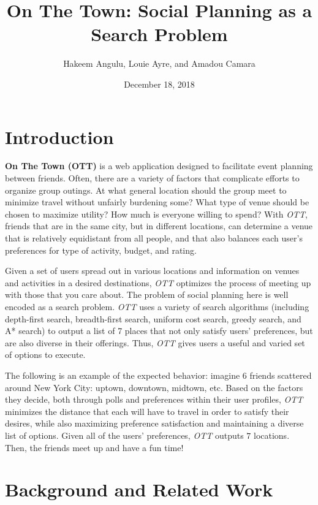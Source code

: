 \documentclass[11pt]{article}
\title{On The Town: Social Planning as a Search Problem}
\author{Hakeem Angulu, Louie Ayre, and Amadou Camara}
\date{December 18, 2018}
\begin{document}
\maketitle{}

\tableofcontents

\newpage

\section{Introduction}

\textbf{On The Town (OTT)} is a web application designed to facilitate event planning between friends. Often, there are a variety of factors that complicate efforts to organize group outings. At what general location should the group meet to minimize travel without unfairly burdening some? What type of venue should be chosen to maximize utility? How much is everyone willing to spend? With \emph{OTT}, friends that are in the same city, but in different locations, can determine a venue  that is relatively equidistant from all people, and that also balances each user's preferences for type of activity, budget, and rating. 

Given a set of users spread out in various locations and information on venues and activities in a desired destinations, \emph{OTT} optimizes the process of meeting up with those that you care about. The problem of social planning here is well encoded as a search problem. \emph{OTT} uses a variety of search algorithms (including depth-first search, breadth-first search, uniform cost search, greedy search, and A* search) to output a list of 7 places that not only satisfy users' preferences, but are also diverse in their offerings. Thus, \emph{OTT} gives users a useful and varied set of options to execute.

The following is an example of the expected behavior: imagine $6$ friends scattered around New York City: uptown, downtown, midtown, etc. Based on the factors they decide, both through polls and preferences within their user profiles, \emph{OTT} minimizes the distance that each will have to travel in order to satisfy their desires, while also maximizing preference satisfaction and maintaining a diverse list of options. Given all of the users’ preferences, \emph{OTT} outputs $7$ locations. Then, the friends meet up and have a fun time!

\section{Background and Related Work}
\end{document}
